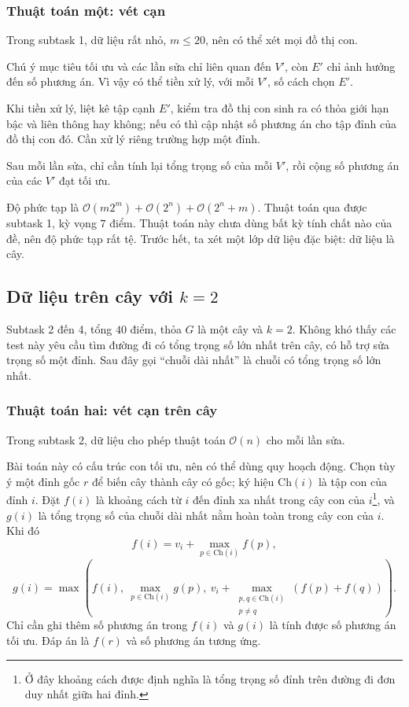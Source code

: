 \documentclass[11pt]{article}
\newcommand{\Oh}{\mathcal{O}}
\begin{document}
\subsubsection{Thuật toán một: vét cạn}

Trong subtask 1, dữ liệu rất nhỏ, \(m\le 20\), nên có thể xét mọi đồ thị con.

Chú ý mục tiêu tối ưu và các lần sửa chỉ liên quan đến \(V'\), còn \(E'\) chỉ
ảnh hưởng đến số phương án. Vì vậy có thể tiền xử lý, với mỗi \(V'\), số cách
chọn \(E'\).

Khi tiền xử lý, liệt kê tập cạnh \(E'\), kiểm tra đồ thị con sinh ra có thỏa
giới hạn bậc và liên thông hay không; nếu có thì cập nhật số phương án cho tập
đỉnh của đồ thị con đó. Cần xử lý riêng trường hợp một đỉnh.

Sau mỗi lần sửa, chỉ cần tính lại tổng trọng số của mỗi \(V'\), rồi cộng số
phương án của các \(V'\) đạt tối ưu.

Độ phức tạp là \(\Oh(m2^m)+\Oh(2^n)+\Oh(2^n+m)\). Thuật toán qua được subtask
1, kỳ vọng \(7\) điểm. Thuật toán này chưa dùng bất kỳ tính chất nào của đề,
nên độ phức tạp rất tệ. Trước hết, ta xét một lớp dữ liệu đặc biệt: dữ liệu là
cây.

\subsection{Dữ liệu trên cây với \texorpdfstring{\(k=2\)}{k=2}}

Subtask 2 đến 4, tổng \(40\) điểm, thỏa \(G\) là một cây và \(k=2\). Không khó
thấy các test này yêu cầu tìm đường đi có tổng trọng số lớn nhất trên cây, có
hỗ trợ sửa trọng số một đỉnh. Sau đây gọi ``chuỗi dài nhất'' là chuỗi có tổng
trọng số lớn nhất.

\subsubsection{Thuật toán hai: vét cạn trên cây}

Trong subtask 2, dữ liệu cho phép thuật toán \(\Oh(n)\) cho mỗi lần sửa.

Bài toán này có cấu trúc con tối ưu, nên có thể dùng quy hoạch động. Chọn tùy
ý một đỉnh gốc \(r\) để biến cây thành cây có gốc; ký hiệu \(\mathrm{Ch}(i)\)
là tập con của đỉnh \(i\). Đặt \(f(i)\) là khoảng cách từ \(i\) đến đỉnh xa
nhất trong cây con của \(i\)\footnote{Ở đây khoảng cách được định nghĩa là
tổng trọng số đỉnh trên đường đi đơn duy nhất giữa hai đỉnh.}, và \(g(i)\) là
tổng trọng số của chuỗi dài nhất nằm hoàn toàn trong cây con của \(i\). Khi đó
\[
  f(i)=v_i+\max_{p\in\mathrm{Ch}(i)} f(p),
\]
\[
  g(i)=\max\left(
    f(i),\ \max_{p\in\mathrm{Ch}(i)}g(p),\
    v_i+\max_{\substack{p,q\in\mathrm{Ch}(i)\\p\ne q}}(f(p)+f(q))
  \right).
\]
Chỉ cần ghi thêm số phương án trong \(f(i)\) và \(g(i)\) là tính được số
phương án tối ưu. Đáp án là \(f(r)\) và số phương án tương ứng.
\end{document}
